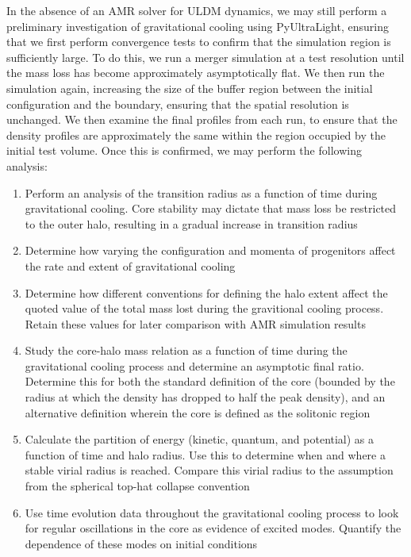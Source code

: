 In the absence of an AMR solver for ULDM dynamics, we may still perform a preliminary investigation of gravitational cooling using PyUltraLight, ensuring that we first perform convergence tests to confirm that the simulation region is sufficiently large. To do this, we run a merger simulation at a test resolution until the mass loss has become approximately asymptotically flat. We then run the simulation again, increasing the size of the buffer region between the initial configuration and the boundary, ensuring that the spatial resolution is unchanged. We then examine the final profiles from each run, to ensure that the density profiles are approximately the same within the region occupied by the initial test volume. Once this is confirmed, we may perform the following analysis:
\begin{enumerate}
    \item Perform an analysis of the transition radius as a function of time during gravitational cooling. Core stability may dictate that mass loss be restricted to the outer halo, resulting in a gradual increase in transition radius
    \item Determine how varying the configuration and momenta of progenitors affect the rate and extent of gravitational cooling
    \item Determine how different conventions for defining the halo extent affect the quoted value of the total mass lost during the gravitional cooling process. Retain these values for later comparison with AMR simulation results
    \item Study the core-halo mass relation as a function of time during the gravitational cooling process and determine an asymptotic final ratio. Determine this for both the standard definition of the core (bounded by the radius at which the density has dropped to half the peak density), and an alternative definition wherein the core is defined as the solitonic region
    \item Calculate the partition of energy (kinetic, quantum, and potential) as a function of time and halo radius. Use this to determine when and where a stable virial radius is reached. Compare this virial radius to the assumption from the spherical top-hat collapse convention
    \item Use time evolution data throughout the gravitational cooling process to look for regular oscillations in the core as evidence of excited modes. Quantify the dependence of these modes on initial conditions
\end{enumerate}



